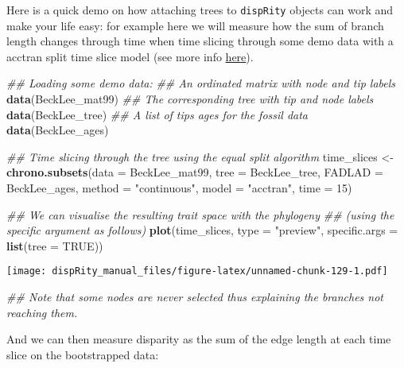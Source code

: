 \documentclass[
]{book}
\newenvironment{Shaded}{\begin{snugshade}}{\end{snugshade}}
\newcommand{\CommentTok}[1]{\textcolor[rgb]{0.56,0.35,0.01}{\textit{#1}}}
\newcommand{\DataTypeTok}[1]{\textcolor[rgb]{0.13,0.29,0.53}{#1}}
\newcommand{\DecValTok}[1]{\textcolor[rgb]{0.00,0.00,0.81}{#1}}
\newcommand{\KeywordTok}[1]{\textcolor[rgb]{0.13,0.29,0.53}{\textbf{#1}}}
\newcommand{\NormalTok}[1]{#1}
\newcommand{\OtherTok}[1]{\textcolor[rgb]{0.56,0.35,0.01}{#1}}
\newcommand{\StringTok}[1]{\textcolor[rgb]{0.31,0.60,0.02}{#1}}
\begin{document}
Here is a quick demo on how attaching trees to \texttt{dispRity} objects can work and make your life easy: for example here we will measure how the sum of branch length changes through time when time slicing through some demo data with a acctran split time slice model (see more info \protect\hyperlink{chrono-subsets}{here}).

\begin{Shaded}
\begin{Highlighting}[]
\CommentTok{\#\# Loading some demo data:}
\CommentTok{\#\# An ordinated matrix with node and tip labels}
\KeywordTok{data}\NormalTok{(BeckLee\_mat99)}
\CommentTok{\#\# The corresponding tree with tip and node labels}
\KeywordTok{data}\NormalTok{(BeckLee\_tree)}
\CommentTok{\#\# A list of tips ages for the fossil data}
\KeywordTok{data}\NormalTok{(BeckLee\_ages)}

\CommentTok{\#\# Time slicing through the tree using the equal split algorithm}
\NormalTok{time\_slices \textless{}{-}}\StringTok{ }\KeywordTok{chrono.subsets}\NormalTok{(}\DataTypeTok{data   =}\NormalTok{ BeckLee\_mat99,}
                              \DataTypeTok{tree   =}\NormalTok{ BeckLee\_tree,}
                              \DataTypeTok{FADLAD =}\NormalTok{ BeckLee\_ages,}
                              \DataTypeTok{method =} \StringTok{"continuous"}\NormalTok{,}
                              \DataTypeTok{model  =} \StringTok{"acctran"}\NormalTok{,}
                              \DataTypeTok{time   =} \DecValTok{15}\NormalTok{)}

\CommentTok{\#\# We can visualise the resulting trait space with the phylogeny}
\CommentTok{\#\# (using the specific argument as follows)}
\KeywordTok{plot}\NormalTok{(time\_slices, }\DataTypeTok{type =} \StringTok{"preview"}\NormalTok{,}
     \DataTypeTok{specific.args =} \KeywordTok{list}\NormalTok{(}\DataTypeTok{tree =} \OtherTok{TRUE}\NormalTok{))}
\end{Highlighting}
\end{Shaded}

\texttt{[image: dispRity\_manual\_files/figure-latex/unnamed-chunk-129-1.pdf]}

\begin{Shaded}
\begin{Highlighting}[]
\CommentTok{\#\# Note that some nodes are never selected thus explaining the branches not reaching them.}
\end{Highlighting}
\end{Shaded}

And we can then measure disparity as the sum of the edge length at each time slice on the bootstrapped data:
\end{document}
